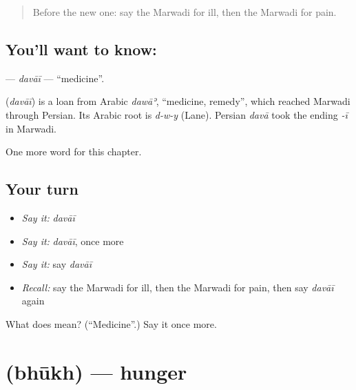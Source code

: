 \label{lesson:MW-C47-davai}



\begin{quote}
Before the new one: say the Marwadi for ill, then the Marwadi for pain.
\end{quote}

\subsection*{You'll want to know: }
\textbf{} — \emph{davāī} — \textquotedblleft{}medicine\textquotedblright{}.

\begin{cousinweb}
\textbf{} (\emph{davāī}) is a loan from Arabic \emph{dawāʾ}, \textquotedblleft{}medicine, remedy\textquotedblright{}, which reached Marwadi through Persian. Its Arabic root is \emph{d-w-y} (Lane). Persian \emph{davā} took the ending \emph{-ī} in Marwadi.
\end{cousinweb}

\begin{grammarlens}[title={What you've built}]
One more word for this chapter.
\end{grammarlens}

\subsection*{Your turn}
\begin{itemize}
\raggedright
  \item \emph{Say it:} \emph{davāī}
  \item \emph{Say it:} \emph{davāī}, once more
  \item \emph{Say it:} say \emph{davāī}
  \item \emph{Recall:} say the Marwadi for ill, then the Marwadi for pain, then say \emph{davāī} again
\end{itemize}

\begin{tcolorbox}[breakable,colback=teal!4,colframe=teal!35!black,title={Before you move on}]
What does  mean? (\textquotedblleft{}Medicine\textquotedblright{}.) Say it once more.
\end{tcolorbox}
\section[\texorpdfstring{\mw{भूख} (bhūkh)}{भूख (bhūkh)}]{ (bhūkh) — hunger}

